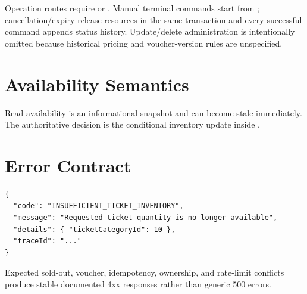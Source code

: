 Operation routes require  or . Manual terminal
commands start from ; cancellation/expiry release resources in
the same transaction and every successful command appends status history.
Update/delete administration is intentionally omitted because historical
pricing and voucher-version rules are unspecified.

\section{Availability Semantics}
Read availability is an informational snapshot and can become stale
immediately. The authoritative decision is the conditional inventory update
inside .

\section{Error Contract}
\begin{lstlisting}[caption={Representative business error}]
{
  "code": "INSUFFICIENT_TICKET_INVENTORY",
  "message": "Requested ticket quantity is no longer available",
  "details": { "ticketCategoryId": 10 },
  "traceId": "..."
}
\end{lstlisting}

Expected sold-out, voucher, idempotency, ownership, and rate-limit conflicts
produce stable documented 4xx responses rather than generic 500 errors.
